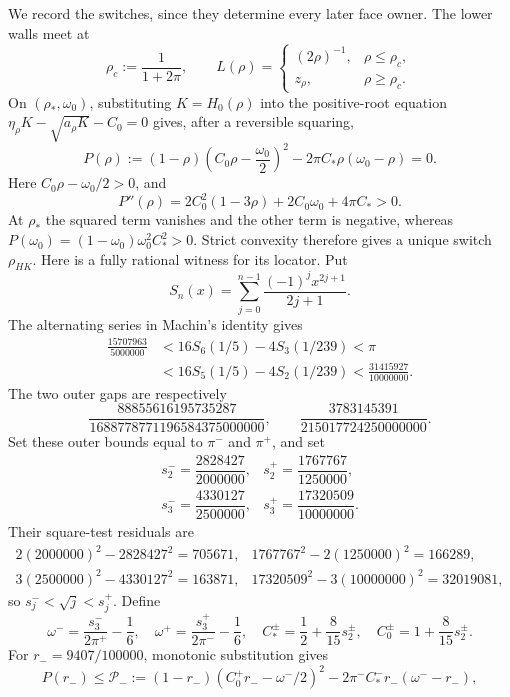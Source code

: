 \documentclass[11pt]{article}
\numberwithin{equation}{section}
\theoremstyle{definition}
\theoremstyle{remark}
\begin{document}
We record the switches, since they determine every later face owner.  The
lower walls meet at
\[
 \rho_c:=\frac1{1+2\pi},\qquad
 L(\rho)=\begin{cases}(2\rho)^{-1},&\rho\leq\rho_c,\\
 z_\rho,&\rho\geq\rho_c.
 \end{cases}
\]
On \((\rho_*,\omega_0)\), substituting \(K=H_0(\rho)\) into the
positive-root equation
\(\eta_\rho K-\sqrt{a_\rho K}-C_0=0\) gives, after a reversible
squaring,
\begin{equation}
 P(\rho):=(1-\rho)\left(C_0\rho-\frac{\omega_0}{2}\right)^2
 -2\pi C_*\rho(\omega_0-\rho)=0.
 \label{cm:eq-Pswitch}
\end{equation}
Here \(C_0\rho-\omega_0/2>0\), and
\[
 P''(\rho)=2C_0^2(1-3\rho)+2C_0\omega_0+4\pi C_*>0.
\]
At \(\rho_*\) the squared term vanishes and the other term is negative,
whereas
\(P(\omega_0)=(1-\omega_0)\omega_0^2C_*^2>0\).  Strict convexity
therefore gives a unique switch \(\rho_{HK}\).  Here is a fully rational
witness for its locator.  Put
\[
 S_n(x)=\sum_{j=0}^{n-1}\frac{(-1)^jx^{2j+1}}{2j+1}.
\]
The alternating series in Machin's identity gives
\[
\begin{aligned}
 \frac{15707963}{5000000}
 &<16S_6(1/5)-4S_3(1/239)<\pi\\
 &<16S_5(1/5)-4S_2(1/239)
 <\frac{31415927}{10000000}.
\end{aligned}
\]
The two outer gaps are respectively
\[
 \frac{88855616195735287}{1688778771196584375000000},
 \qquad
 \frac{3783145391}{215017724250000000}.
\]
Set these outer bounds equal to \(\pi^-\) and \(\pi^+\), and set
\[
\begin{array}{ll}
 s_2^-=\dfrac{2828427}{2000000},&
 s_2^+=\dfrac{1767767}{1250000},\\[3pt]
 s_3^-=\dfrac{4330127}{2500000},&
 s_3^+=\dfrac{17320509}{10000000}.
\end{array}
\]
Their square-test residuals are
\[
\begin{array}{ll}
2(2000000)^2-2828427^2=705671,&
1767767^2-2(1250000)^2=166289,\\
3(2500000)^2-4330127^2=163871,&
17320509^2-3(10000000)^2=32019081,
\end{array}
\]
so \(s_j^-<\sqrt j<s_j^+\).  Define
\[
 \omega^-=\frac{s_3^-}{2\pi^+}-\frac16,\quad
 \omega^+=\frac{s_3^+}{2\pi^-}-\frac16,\quad
 C_*^\pm=\frac12+\frac8{15}s_2^\pm,\quad
 C_0^\pm=1+\frac8{15}s_2^\pm .
\]
For \(r_-=9407/100000\), monotonic substitution gives
\[
 P(r_-)\leq\mathcal P_-:=
 (1-r_-)(C_0^+r_--\omega^-/2)^2
 -2\pi^-C_*^-r_-(\omega^--r_-),
\]
\end{document}
